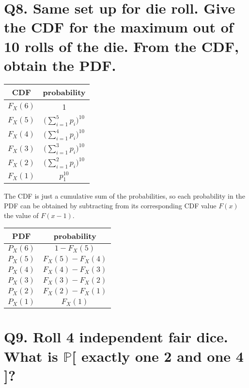 \documentclass{article}
\begin{document}
\section*{Q8. \normalsize Same set up for die roll. Give the CDF for the maximum out of 10 rolls of the die. From the CDF, obtain the PDF.}

\bgroup
\def\arraystretch{1.5}
\begin{table}[h!]
  \centering
  \begin{tabular} {c | c}
    CDF & probability \\ [0.5ex]
    \hline
    $F_X(6)$ & 1\\
    $F_X(5)$ & $\Big(\sum_{i=1}^5 p_i \Big)^{10}$ \\
    $F_X(4)$ & $\Big(\sum_{i=1}^4 p_i \Big)^{10}$ \\
    $F_X(3)$ & $\Big(\sum_{i=1}^3 p_i \Big)^{10}$ \\
    $F_X(2)$ & $\Big(\sum_{i=1}^2 p_i \Big)^{10}$ \\
    $F_X(1)$ & $p_1^{10}$ \\
  \end{tabular}
\end{table}

The CDF is just a cumulative sum of the probabilities, so each probability in the PDF can be obtained by subtracting from its corresponding CDF value $F(x)$ the value of $F(x-1)$.

\bgroup
\def\arraystretch{1.5}
\begin{table}[h!]
  \centering
  \begin{tabular} {c | c}
    PDF & probability \\ [0.5ex]
    \hline
    $P_X(6)$ & $1 - F_X(5)$ \\
    $P_X(5)$ & $F_X(5) - F_X(4)$ \\
    $P_X(4)$ & $F_X(4) - F_X(3)$ \\
    $P_X(3)$ & $F_X(3) - F_X(2)$ \\
    $P_X(2)$ & $F_X(2) - F_X(1)$ \\
    $P_X(1)$ & $F_X(1)$ \\
  \end{tabular}
\end{table}




\section*{Q9. \normalsize Roll 4 independent fair dice. What is $\mathbb{P}$[ exactly one 2 and one 4 ]?}
\end{document}
